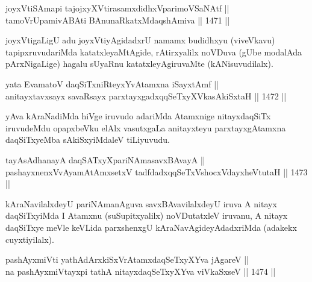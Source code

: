 
\begin{shl}
joyxVtiSAmapi tajojxyXVtirasamxdidhxVparimoVSaNAtf || \\
tamoVrUpamivA\s \s BAti BAnunaRkatxMdaqshAmiva ||  1471 ||  
\end{shl}

\begin{artha}
joyxVtigaLigU adu joyxVtiyAgidadxrU namamx budidhxyu (viveVkavu) tapipxruvudariMda katatxleyaMtAgide, rAtirxyalilx noVDuva (gUbe modalAda pArxNigaLige) hagalu sUyaRnu katatxleyAgiruvaMte (kANisuvudilalx).
\end{artha}


\begin{shl}
yata EvamatoV daqSiTxniRteyxYvA\s \s tamxna iSayxtAmf || \\
anitayxtavxsayx savaRsayx parxtayxgadxqqSeTxyXVkasAkiSxtaH ||  1472 ||  
\end{shl}

\begin{artha}
yAva kAraNadiMda hiVge iruvudo adariMda Atamxnige nitayxdaqSiTx iruvudeMdu opapxbeVku elAlx vasutxgaLa anitayxteyu parxtayxgAtamxna daqSiTxyeMba sAkiSxyiMdaleV tiLiyuvudu.
\end{artha}


\begin{shl}
tayA\s sAdhanayA daqSATxyX\s pariNAmasavxBAvayA ||  \\
pashayxnenxVvAyamAtAmx\s \s setxV tadfdadxqqSeTxVshocxVdayxheVtutaH ||  1473 ||  
\end{shl}

\begin{artha}
kAraNavilalxdeyU pariNAmanAguva savxBAvavilalxdeyU iruva A nitayx daqSiTxyiMda I Atamxnu (suSupitxyalilx) noVDutatxleV iruvanu, A nitayx daqSiTxye meVle keVLida parxshenxgU kAraNavAgideyAdadxriMda (adakekx cuyxtiyilalx).
\end{artha}


\begin{shl}
pashAyxmiVti yathA\s dArxkiSxVrAtamxdaqSeTxyXYva jAgareV || \\
na pashAyxmiVtayxpi tathA nitayxdaqSeTxyXYva viVkaSxseV ||  1474 ||  
\end{shl}

